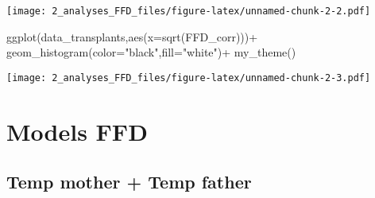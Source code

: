 \documentclass[
]{article}
\newenvironment{Shaded}{\begin{snugshade}}{\end{snugshade}}
\newcommand{\AttributeTok}[1]{\textcolor[rgb]{0.77,0.63,0.00}{#1}}
\newcommand{\FunctionTok}[1]{\textcolor[rgb]{0.00,0.00,0.00}{#1}}
\newcommand{\NormalTok}[1]{#1}
\newcommand{\OtherTok}[1]{\textcolor[rgb]{0.56,0.35,0.01}{#1}}
\newcommand{\SpecialCharTok}[1]{\textcolor[rgb]{0.00,0.00,0.00}{#1}}
\newcommand{\StringTok}[1]{\textcolor[rgb]{0.31,0.60,0.02}{#1}}
\begin{document}
\texttt{[image: 2\_analyses\_FFD\_files/figure-latex/unnamed-chunk-2-2.pdf]}

\begin{Shaded}
\begin{Highlighting}[]
\FunctionTok{ggplot}\NormalTok{(data\_transplants,}\FunctionTok{aes}\NormalTok{(}\AttributeTok{x=}\FunctionTok{sqrt}\NormalTok{(FFD\_corr)))}\SpecialCharTok{+}
  \FunctionTok{geom\_histogram}\NormalTok{(}\AttributeTok{color=}\StringTok{"black"}\NormalTok{,}\AttributeTok{fill=}\StringTok{"white"}\NormalTok{)}\SpecialCharTok{+}
  \FunctionTok{my\_theme}\NormalTok{()}
\end{Highlighting}
\end{Shaded}

\texttt{[image: 2\_analyses\_FFD\_files/figure-latex/unnamed-chunk-2-3.pdf]}

\hypertarget{models-ffd}{%
\section{Models FFD}\label{models-ffd}}

\hypertarget{temp-mother-temp-father}{%
\subsection{Temp mother + Temp father}\label{temp-mother-temp-father}}

\begin{Shaded}
\end{Shaded}
\end{document}
